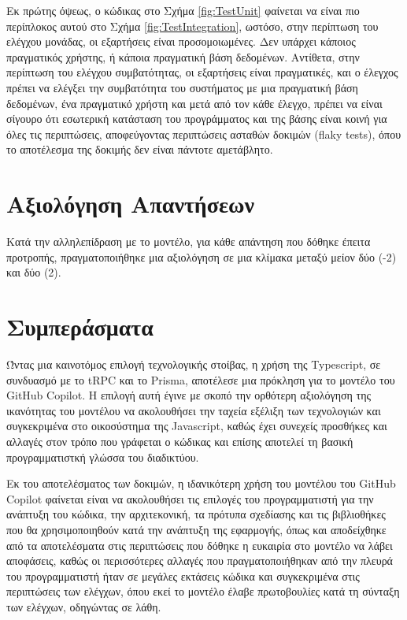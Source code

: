 Εκ πρώτης όψεως, ο κώδικας στο Σχήμα \ref{fig:TestUnit} φαίνεται να
είναι πιο περίπλοκος αυτού στο Σχήμα \ref{fig:TestIntegration}, ωστόσο,
στην περίπτωση του ελέγχου μονάδας, οι εξαρτήσεις είναι προσομοιωμένες.
Δεν υπάρχει κάποιος πραγματικός χρήστης, ή κάποια πραγματική βάση
δεδομένων. Αντίθετα, στην περίπτωση του ελέγχου συμβατότητας, οι
εξαρτήσεις είναι πραγματικές, και ο έλεγχος πρέπει να ελέγξει την
συμβατότητα του συστήματος με μια πραγματική βάση δεδομένων, ένα
πραγματικό χρήστη και μετά από τον κάθε έλεγχο, πρέπει να είναι σίγουρο
ότι εσωτερική κατάσταση του προγράμματος και της βάσης είναι κοινή για
όλες τις περιπτώσεις, αποφεύγοντας περιπτώσεις ασταθών δοκιμών
(\textlatin{flaky tests}), όπου το αποτέλεσμα της δοκιμής δεν είναι
πάντοτε αμετάβλητο. \cite{Parry2022}

\section{Αξιολόγηση Απαντήσεων}

Κατά την αλληλεπίδραση με το μοντέλο, για κάθε απάντηση που δόθηκε
έπειτα προτροπής, πραγματοποιήθηκε μια αξιολόγηση σε μια κλίμακα μεταξύ
μείον δύο (-2) και δύο (2).

\section{Συμπεράσματα}

Ώντας μια καινοτόμος επιλογή τεχνολογικής στοίβας, η χρήση της
\textlatin{Typescript}, σε συνδυασμό με το \textlatin{tRPC} και το
\textlatin{Prisma}, αποτέλεσε μια πρόκληση για το μοντέλο του
\textlatin{GitHub Copilot}. Η επιλογή αυτή έγινε με σκοπό την ορθότερη
αξιολόγηση της ικανότητας του μοντέλου να ακολουθήσει την ταχεία εξέλιξη
των τεχνολογιών και συγκεκριμένα στο οικοσύστημα της
\textlatin{Javascript}, καθώς έχει συνεχείς προσθήκες και αλλαγές στον
τρόπο που γράφεται ο κώδικας και επίσης αποτελεί τη βασική
προγραμματιστκή γλώσσα του διαδικτύου.

Εκ του αποτελέσματος των δοκιμών, η ιδανικότερη χρήση του μοντέλου του
\textlatin{GitHub Copilot} φαίνεται είναι να ακολουθήσει τις επιλογές
του προγραμματιστή για την ανάπτυξη του κώδικα, την αρχιτεκονική, τα
πρότυπα σχεδίασης και τις βιβλιοθήκες που θα χρησιμοποιηθούν κατά την
ανάπτυξη της εφαρμογής, όπως και αποδείχθηκε από τα αποτελέσματα στις
περιπτώσεις που δόθηκε η ευκαιρία στο μοντέλο να λάβει αποφάσεις, καθώς
οι περισσότερες αλλαγές που πραγματοποιήθηκαν από την πλευρά του
προγραμματιστή ήταν σε μεγάλες εκτάσεις κώδικα και συγκεκριμένα στις
περιπτώσεις των ελέγχων, όπου εκεί το μοντέλο έλαβε πρωτοβουλίες κατά τη
σύνταξη των ελέγχων, οδηγώντας σε λάθη.
